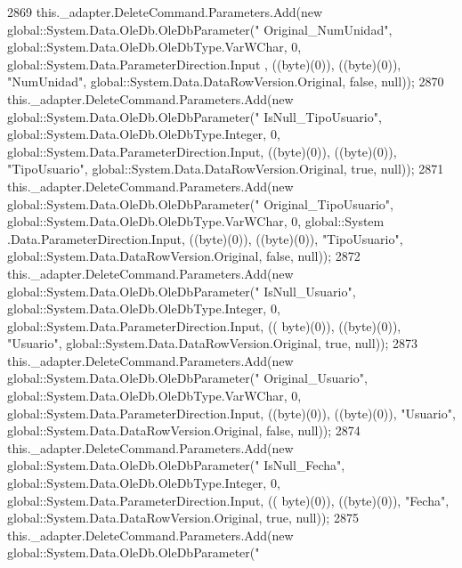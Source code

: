 \begin{DoxyCode}
2869             this.\_adapter.DeleteCommand.Parameters.Add(\textcolor{keyword}{new} global::System.Data.OleDb.OleDbParameter(\textcolor{stringliteral}{"
      Original\_NumUnidad"}, global::System.Data.OleDb.OleDbType.VarWChar, 0, global::System.Data.ParameterDirection.Input
      , ((byte)(0)), ((byte)(0)), \textcolor{stringliteral}{"NumUnidad"}, global::System.Data.DataRowVersion.Original, \textcolor{keyword}{false}, null));
2870             this.\_adapter.DeleteCommand.Parameters.Add(\textcolor{keyword}{new} global::System.Data.OleDb.OleDbParameter(\textcolor{stringliteral}{"
      IsNull\_TipoUsuario"}, global::System.Data.OleDb.OleDbType.Integer, 0, global::System.Data.ParameterDirection.Input,
       ((byte)(0)), ((byte)(0)), \textcolor{stringliteral}{"TipoUsuario"}, global::System.Data.DataRowVersion.Original, \textcolor{keyword}{true}, null));
2871             this.\_adapter.DeleteCommand.Parameters.Add(\textcolor{keyword}{new} global::System.Data.OleDb.OleDbParameter(\textcolor{stringliteral}{"
      Original\_TipoUsuario"}, global::System.Data.OleDb.OleDbType.VarWChar, 0, global::System
      .Data.ParameterDirection.Input, ((byte)(0)), ((byte)(0)), \textcolor{stringliteral}{"TipoUsuario"}, global::System.Data.DataRowVersion.Original, \textcolor{keyword}{false}, null));
2872             this.\_adapter.DeleteCommand.Parameters.Add(\textcolor{keyword}{new} global::System.Data.OleDb.OleDbParameter(\textcolor{stringliteral}{"
      IsNull\_Usuario"}, global::System.Data.OleDb.OleDbType.Integer, 0, global::System.Data.ParameterDirection.Input, ((
      byte)(0)), ((byte)(0)), \textcolor{stringliteral}{"Usuario"}, global::System.Data.DataRowVersion.Original, \textcolor{keyword}{true}, null));
2873             this.\_adapter.DeleteCommand.Parameters.Add(\textcolor{keyword}{new} global::System.Data.OleDb.OleDbParameter(\textcolor{stringliteral}{"
      Original\_Usuario"}, global::System.Data.OleDb.OleDbType.VarWChar, 0, global::System.Data.ParameterDirection.Input, 
      ((byte)(0)), ((byte)(0)), \textcolor{stringliteral}{"Usuario"}, global::System.Data.DataRowVersion.Original, \textcolor{keyword}{false}, null));
2874             this.\_adapter.DeleteCommand.Parameters.Add(\textcolor{keyword}{new} global::System.Data.OleDb.OleDbParameter(\textcolor{stringliteral}{"
      IsNull\_Fecha"}, global::System.Data.OleDb.OleDbType.Integer, 0, global::System.Data.ParameterDirection.Input, ((
      byte)(0)), ((byte)(0)), \textcolor{stringliteral}{"Fecha"}, global::System.Data.DataRowVersion.Original, \textcolor{keyword}{true}, null));
2875             this.\_adapter.DeleteCommand.Parameters.Add(\textcolor{keyword}{new} global::System.Data.OleDb.OleDbParameter(\textcolor{stringliteral}{"
}
\end{DoxyCode}
